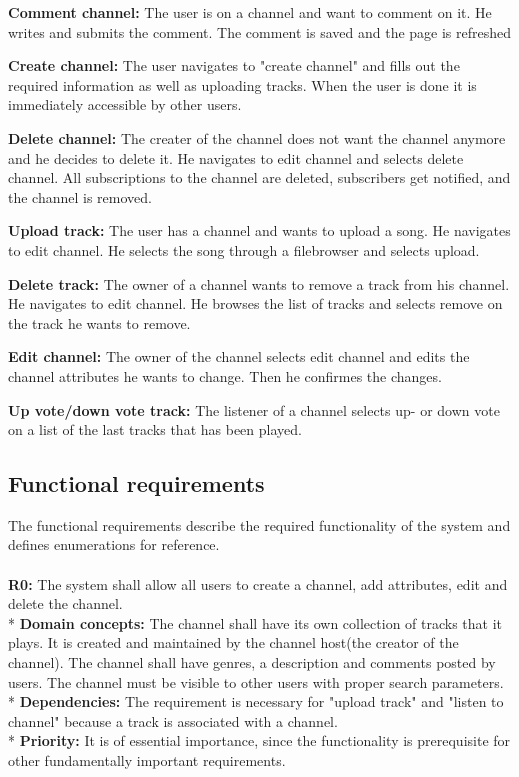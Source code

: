 \documentclass[a4paper,11pt,report]{article}
\begin{document}
{\textbf{Comment channel:}
The user is on a channel and want to comment on it. He writes and submits the comment. The comment is saved and the page is refreshed

\textbf{Create channel:}
The user navigates to "create channel" and fills out the required information as well as uploading tracks. When the user is done it is immediately accessible by other users.

\textbf{Delete channel:}
The creater of the channel does not want the channel anymore and he decides to delete it. He navigates to edit channel and selects delete channel. All subscriptions to the channel are deleted, subscribers get notified, and the channel is removed.

\textbf{Upload track:}
The user has a channel and wants to upload a song. He navigates to edit channel. He selects the song through a filebrowser and selects upload.

\textbf{Delete track:}
The owner of a channel wants to remove a track from his channel. He navigates to edit channel. He browses the list of tracks and selects remove on the track he wants to remove.

\textbf{Edit channel:}
The owner of the channel selects edit channel and edits the channel attributes he wants to change. Then he confirmes the changes.

\textbf{Up vote/down vote track:}
The listener of a channel selects up- or down vote on a list of the last tracks that has been played.

\subsection{Functional requirements}
The functional requirements describe the required functionality of the system and defines enumerations for reference.
\\ \\
\textbf{R0:}
The system shall allow all users to create a channel, add attributes, edit and delete the channel. \\*
\textbf{Domain concepts:}
The channel shall have its own collection of tracks that it plays. It is created and maintained by the channel host(the creator of the channel).
The channel shall have genres, a description and comments posted by users.
The channel must be visible to other users with proper search parameters. \\*
\textbf{Dependencies:} 
The requirement is necessary for "upload track" and "listen to channel" because a track is associated with a channel. \\*
\textbf{Priority:} 
It is of essential importance, since the functionality is prerequisite for other fundamentally important requirements.
\\ \\

}
\end{document}
